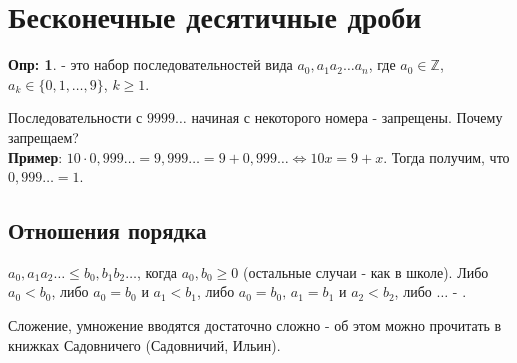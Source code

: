 \documentclass[12pt]{article}
\theoremstyle{definition}
\newtheorem{defn}{Опр:}
\begin{document}
\section*{Бесконечные десятичные дроби}
\begin{defn}
	 - это набор последовательностей вида $a_0{,}a_1a_2\dotsc a_n$, где $a_0 \in \mathbb{Z}$, $a_k \in \{0, 1, \dotsc ,9\}$, $k \geq 1$.
\end{defn}

Последовательности с $9999\dotsc$ начиная с некоторого номера - запрещены. Почему запрещаем?\\
\textbf{Пример}: $10 \cdot 0{,}999\dotsc = 9{,}999\dotsc = 9 + 0{,}999\dotsc \Leftrightarrow 10x = 9 + x$. Тогда получим, что $0{,}999\dotsc = 1$.

\subsection*{Отношения порядка}
$a_0{,}a_1a_2\dotsc \leq b_0{,}b_1b_2\dotsc$, когда $a_0, b_0 \geq 0$ (остальные случаи - как в школе). 
Либо $a_0 < b_0$, либо $a_0 = b_0$ и $a_1 < b_1$, либо $a_0 = b_0, \, a_1 = b_1$ и $a_2 < b_2$, либо $\dotsc$ - .

Сложение, умножение вводятся достаточно сложно - об этом можно прочитать в книжках Садовничего (Садовничий, Ильин).
\end{document}
